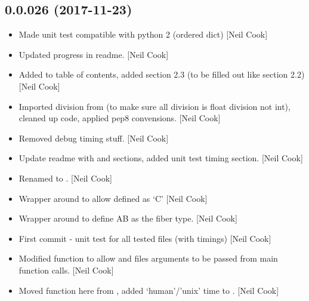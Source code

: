 \documentclass[a4paper,10pt,english]{report}
\begin{document}
\subsection{0.0.026 (2017-11-23)}
\label{\detokenize{misc/changelog:id526}}\begin{itemize}
\item {} 
Made unit test compatible with python 2 (ordered dict) {[}Neil Cook{]}

\item {} 
Updated progress in readme. {[}Neil Cook{]}

\item {} 
Added to table of contents, added section 2.3 (to be filled out like
section 2.2) {[}Neil Cook{]}

\item {} 
Imported division from  (to make sure all division is float
division not int), cleaned up code, applied pep8 convensions. {[}Neil
Cook{]}

\item {} 
Removed debug timing stuff. {[}Neil Cook{]}

\item {} 
Update readme with  and  sections, added unit test
timing section. {[}Neil Cook{]}

\item {} 
Renamed  to . {[}Neil Cook{]}

\item {} 
Wrapper around  to allow  defined as
‘C’ {[}Neil Cook{]}

\item {} 
Wrapper around  to define AB as the fiber type.
{[}Neil Cook{]}

\item {} 
First commit - unit test for all tested files (with timings) {[}Neil
Cook{]}

\item {} 
Modified  function to allow  and files
arguments to be passed from main function calls. {[}Neil Cook{]}

\item {} 
Moved  function here from , added
‘human’/’unix’ time to . {[}Neil Cook{]}


\end{itemize}
\end{document}
